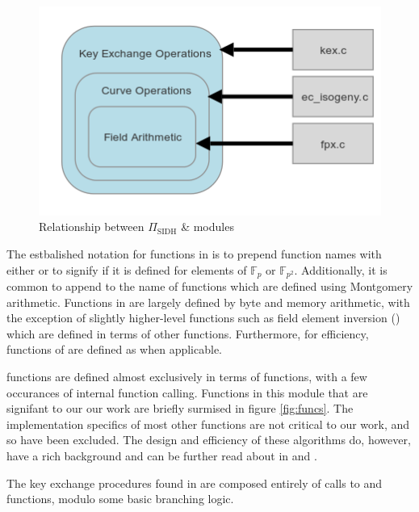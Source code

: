\begin{figure}[!htb]
\centering
\includegraphics[scale=0.7]{halfmapwcurve.png} %
\caption{Relationship between $\Pi_{\text{SIDH}}$ \& \sidh modules}
\label{fig:halfmap} %
\end{figure}

The estbalished notation for functions in  is to prepend function names with either  or  to signify if it is defined for elements of $\mathbb{F}_{p}$ or $\mathbb{F}_{p^2}$. Additionally, it is common to append  to the name of functions which are defined using Montgomery arithmetic. Functions in  are largely defined by byte and memory arithmetic, with the exception of slightly higher-level functions such as field element inversion () which are defined in terms of other  functions. Furthermore, for efficiency, functions of  are defined as  when applicable.

 functions are defined almost exclusively in terms of  functions, with a few occurances of internal function calling. Functions in this module that are signifant to our our work are briefly surmised in figure \ref{fig:funcs}. The implementation specifics of most other  functions are not critical to our work, and so have been excluded. The design and efficiency of these algorithms do, however, have a rich background and can be further read about in \cite{djp} and \cite{effalg}.

The key exchange procedures found in  are composed entirely of calls to  and  functions, modulo some basic branching logic.

